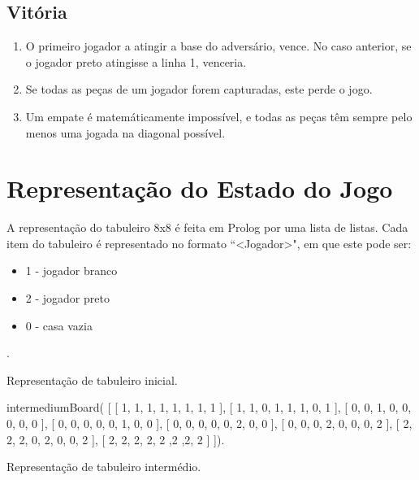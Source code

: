 \documentclass[15pt,a4paper]{article}
\begin{document}
\subsection{Vitória}
\begin{enumerate}
\item O primeiro jogador a atingir a base do adversário, vence. No caso anterior, se o jogador preto atingisse a linha 1, venceria.
\item Se todas as peças de um jogador forem capturadas, este perde o jogo.
\item Um empate é matemáticamente impossível, e todas as peças têm sempre pelo menos uma jogada na diagonal possível.
\end{enumerate}


 
\section{Representação do Estado do Jogo}

A representação do tabuleiro 8x8 é feita em Prolog por uma lista de listas.
Cada item do tabuleiro é representado no formato ``<Jogador>", em que este pode ser:
\begin{itemize}
\item 1 - jogador branco
\item 2 - jogador preto
\item 0 - casa vazia
\end{itemize}

\begin{code}[H]
	\begin{verbatimtab}

.
\end{verbatimtab}
\caption{Representação de tabuleiro inicial.}
\end{code}


\begin{code}[H]
	\begin{verbatimtab}

intermediumBoard(
	[
		[ 1, 1, 1, 1, 1, 1, 1, 1 ],
		[ 1, 1, 0, 1, 1, 1, 0, 1 ],
		[ 0, 0, 1, 0, 0, 0, 0, 0 ],
		[ 0, 0, 0, 0, 0, 1, 0, 0 ],
		[ 0, 0, 0, 0, 0, 2, 0, 0 ],
		[ 0, 0, 0, 2, 0, 0, 0, 2 ],
		[ 2, 2, 2, 0, 2, 0, 0, 2 ],
		[ 2, 2, 2, 2, 2 ,2 ,2, 2 ]
	]).
\end{verbatimtab}
\caption{Representação de tabuleiro intermédio.}
\end{code}
\end{document}

